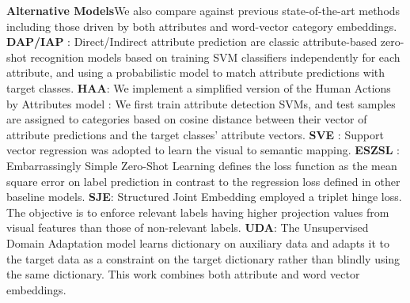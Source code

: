\documentclass[runningheads]{llncs}
\begin{document}
\begin{table}[t]
\centering
\caption{Data augmentation and importance weighting for ZSL action recognition.}
\label{tab:ImportanceWeighting}
\end{table}


\noindent\textbf{Alternative Models}\quad We also compare against previous state-of-the-art methods including those driven by both attributes and word-vector category embeddings.
\textbf{DAP/IAP} \cite{Lampert2009}: Direct/Indirect attribute prediction are classic attribute-based zero-shot recognition models based on training SVM classifiers independently for each attribute, and using a probabilistic model to match attribute predictions with target classes.
\textbf{HAA}: We implement a simplified version of the Human Actions by Attributes model \cite{Liu2011}: We first train attribute detection SVMs, and test samples are assigned to categories based on cosine distance between their vector of attribute predictions and the target classes' attribute vectors. {\textbf{SVE} \cite{Xu2015}: Support vector regression was adopted to learn the visual to semantic mapping.} \textbf{ESZSL} \cite{Romera-paredes2015}: Embarrassingly Simple Zero-Shot Learning defines the loss function as the mean square error on label prediction in contrast to the regression loss defined in other baseline models. 
{\textbf{SJE}: Structured Joint Embedding \cite{Akata2015} employed a triplet hinge loss. The objective is to enforce relevant labels having higher projection values from visual features than those of non-relevant labels.} \textbf{UDA}: The Unsupervised Domain Adaptation model \cite{Kodirov2015} learns dictionary on auxiliary data and adapts it to the target data as a constraint on the target dictionary rather than blindly using the same dictionary. 
This work combines both attribute and word vector embeddings.
\end{document}
